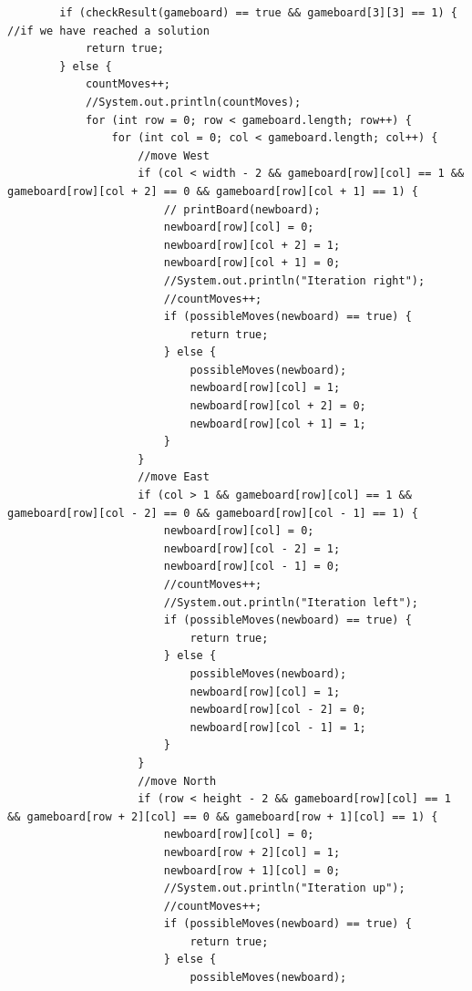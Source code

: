 \documentclass{article}
\begin{document}
\begin{lstlisting}
        if (checkResult(gameboard) == true && gameboard[3][3] == 1) { //if we have reached a solution
            return true;
        } else {
            countMoves++;
            //System.out.println(countMoves);
            for (int row = 0; row < gameboard.length; row++) {
                for (int col = 0; col < gameboard.length; col++) {
                    //move West
                    if (col < width - 2 && gameboard[row][col] == 1 && gameboard[row][col + 2] == 0 && gameboard[row][col + 1] == 1) {
                        // printBoard(newboard);
                        newboard[row][col] = 0;
                        newboard[row][col + 2] = 1;
                        newboard[row][col + 1] = 0;
                        //System.out.println("Iteration right");
                        //countMoves++;
                        if (possibleMoves(newboard) == true) {
                            return true;
                        } else {
                            possibleMoves(newboard);
                            newboard[row][col] = 1;
                            newboard[row][col + 2] = 0;
                            newboard[row][col + 1] = 1;
                        }
                    }
                    //move East
                    if (col > 1 && gameboard[row][col] == 1 && gameboard[row][col - 2] == 0 && gameboard[row][col - 1] == 1) {
                        newboard[row][col] = 0;
                        newboard[row][col - 2] = 1;
                        newboard[row][col - 1] = 0;
                        //countMoves++;
                        //System.out.println("Iteration left");
                        if (possibleMoves(newboard) == true) {
                            return true;
                        } else {
                            possibleMoves(newboard);
                            newboard[row][col] = 1;
                            newboard[row][col - 2] = 0;
                            newboard[row][col - 1] = 1;
                        }
                    }
                    //move North
                    if (row < height - 2 && gameboard[row][col] == 1 && gameboard[row + 2][col] == 0 && gameboard[row + 1][col] == 1) {
                        newboard[row][col] = 0;
                        newboard[row + 2][col] = 1;
                        newboard[row + 1][col] = 0;
                        //System.out.println("Iteration up");
                        //countMoves++;
                        if (possibleMoves(newboard) == true) {
                            return true;
                        } else {
                            possibleMoves(newboard);


\end{lstlisting}
\end{document}
